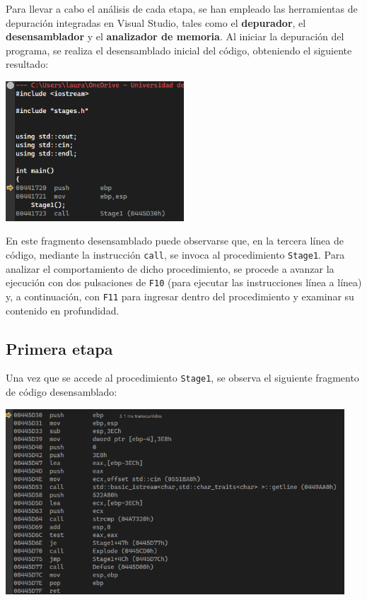 \documentclass[11pt,a4paper]{article}
\begin{document}
\noindent Para llevar a cabo el análisis de cada etapa, se han empleado las herramientas de depuración integradas en Visual Studio, tales como el \textbf{depurador}, el \textbf{desensamblador} y el \textbf{analizador de memoria}. Al iniciar la depuración del programa, se realiza el desensamblado inicial del código, obteniendo el siguiente resultado:

\begin{center}
\includegraphics[width=0.5\textwidth]{desarrollo-i.png}
\end{center}

\noindent En este fragmento desensamblado puede observarse que, en la tercera línea de código, mediante la instrucción \texttt{call}, se invoca al procedimiento \texttt{Stage1}. Para analizar el comportamiento de dicho procedimiento, se procede a avanzar la ejecución con dos pulsaciones de \texttt{F10} (para ejecutar las instrucciones línea a línea) y, a continuación, con \texttt{F11} para ingresar dentro del procedimiento y examinar su contenido en profundidad.

\vspace{3ex}


\subsection{Primera etapa}
Una vez que se accede al procedimiento \texttt{Stage1}, se observa el siguiente fragmento de código desensamblado:
\begin{center}
\includegraphics[width=0.95\textwidth]{s1-1.png}
\end{center}
\end{document}
